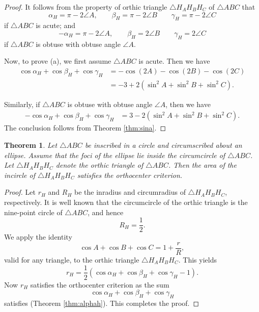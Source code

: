 \documentclass[11pt,reqno]{amsart}
\newtheorem{theorem}{Theorem}[section]
\theoremstyle{definition}
\numberwithin{equation}{section}
\begin{document}
\begin{proof} It follows from the property of orthic triangle $\triangle H_AH_BH_C$ of $\triangle ABC$ that
    \begin{equation*}
        \alpha_H=\pi-2\angle A,\qquad \beta_H=\pi-2\angle B\qquad \gamma_H=\pi-2\angle C
    \end{equation*}
if $\triangle ABC$ is acute; and
\begin{equation*}
        -\alpha_H=\pi-2\angle A,\qquad \beta_H=2\angle B\qquad \gamma_H=2\angle C
    \end{equation*}
    if $\triangle ABC$ is obtuse with obtuse angle $\angle A$.

Now, to prove (a), we first assume $\triangle ABC$ is acute. Then we have
\begin{align*}
    \cos \alpha_H+\cos \beta_H+\cos \gamma_H&=-\cos (2A)-\cos (2B )-\cos (2C)\\
    &=-3+2(\sin^2 A+\sin^2 B+\sin^2 C).
\end{align*}

Similarly, if $\triangle ABC$ is obtuse with obtuse angle $\angle A$, then we have
\begin{align*}
    -\cos \alpha_H+\cos \beta_H+\cos \gamma_H&=3-2(\sin^2 A+\sin^2 B+\sin^2 C).
\end{align*}
The conclusion follows from Theorem \ref{thm:sina}.
\end{proof}

\begin{theorem}\label{thm:congorth}
Let $\triangle ABC$ be inscribed in a circle and circumscribed about an ellipse. Assume that the foci of the ellipse lie inside the circumcircle of $\triangle ABC$. Let $\triangle H_AH_BH_C$ denote the orthic triangle of $\triangle ABC$. Then the area of the incircle of $\triangle H_AH_BH_C$ satisfies the orthocenter criterion.
\end{theorem}
\begin{proof}
Let $r_H$ and $R_H$ be the inradius and circumradius of $\triangle H_AH_BH_C$, respectively. It is well known that the circumcircle of the orthic triangle is the nine-point circle of $\triangle ABC$, and hence
\[
R_H = \frac{1}{2}.
\]
We apply the identity
\begin{equation}\label{eq:sumcos}
\cos A + \cos B + \cos C = 1 + \frac{r}{R},
\end{equation}
valid for any triangle, to the orthic triangle $\triangle H_AH_BH_C$. This yields
\[
r_H = \frac12(\cos \alpha_H + \cos \beta_H + \cos \gamma_H - 1).
\]
Now $r_H$ satisfies the orthocenter criterion as the sum
\[
\cos \alpha_H + \cos \beta_H + \cos \gamma_H
\]
satisfies (Theorem \ref{thm:alphah}). This completes the proof.
\end{proof}
\end{document}
